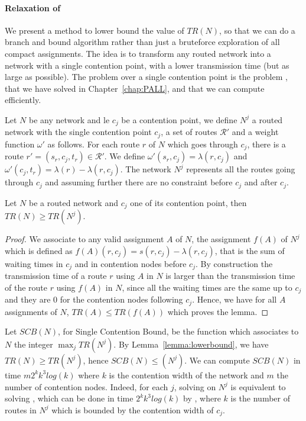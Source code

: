 \paragraph{Relaxation of \spall}

We present a method to lower bound the value of $TR(N)$, so that we can do a branch and 
bound algorithm rather than just a bruteforce exploration of all compact assignments.
The idea is to transform any routed network into a network with a single contention point, 
with a lower transmission time (but as large as possible). The problem \spall over a single contention point is the problem \wta, that we have solved in Chapter~\ref{chap:PALL}, and that we can compute efficiently.

Let $N$ be any network and le $c_j$ be a contention point, we define $N^j$ a routed network with the
single contention point $c_j$, a set of routes $\mathcal{R}'$ and a weight function $\omega'$ as follows. For each route $r$ of $N$ which goes through $c_j$, there is a route $r' = (s_r,c_j,t_r) \in \mathcal{R}'$. We define $\omega'(s_r,c_j) = \lambda(r,c_j)$ and $\omega'(c_j,t_r) =  \lambda(r) - \lambda(r,c_j)$. The network $N^j$ represents all the routes going through $c_j$ and assuming further there are no constraint before $c_j$ and after $c_j$.   

\begin{lemma}\label{lemma:lowerbound}
Let $N$ be a routed network and $c_j$ one of its contention point, then $TR(N) \geq TR(N^j)$.
\end{lemma}
\begin{proof}
We associate to any valid assignment $A$ of $N$, the assignment $f(A)$ of $N^j$
which is defined as $f(A)(r,c_j) = s(r,c_j) - \lambda(r,c_j)$, that is the sum of waiting times in $c_j$ and in contention nodes before $c_j$. By construction the transmission time of a route $r$ using $A$ in $N$ is larger than 
the transmission time of the route $r$ using $f(A)$ in $N$, since all the waiting times are the same up to 
$c_j$ and they are $0$ for the contention nodes following $c_j$. Hence, we have for all $A$ assignments of $N$,
$TR(A) \leq TR(f(A))$ which proves the lemma.
\end{proof}



Let $SCB(N)$, for Single Contention Bound, be the function which associates to $N$ the integer 
$\max_{j} TR(N^j)$. By Lemma~\ref{lemma:lowerbound}, we have $TR(N) \geq TR(N^j)$, hence $SCB(N) \leq (N^j)$.
We can compute $SCB(N)$ in time $m2^kk^3log(k)$ where $k$ is the contention width of the network and $m$ the number 
of contention nodes. Indeed, for each $j$, solving \spall on $N^j$ is equivalent to solving \wta, which can be done
in time $2^kk^3log(k)$ by \ASPMLS, where $k$ is the number of routes in $N^j$ which is bounded by the contention width of $c_j$.




